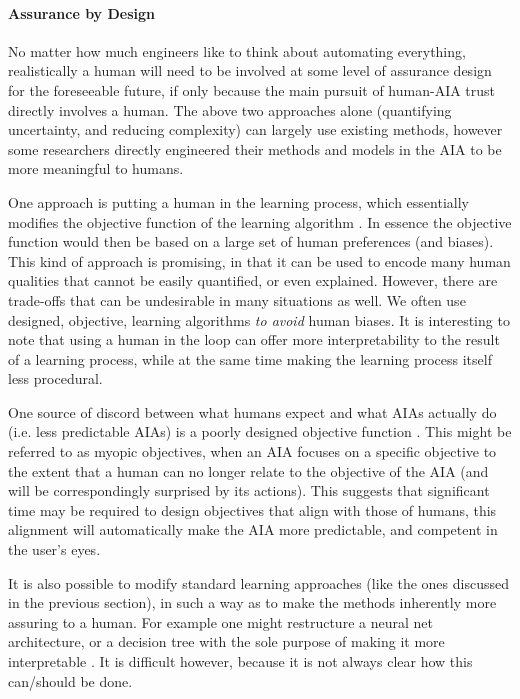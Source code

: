     \paragraph{Assurance by Design} No matter how much engineers like to think about automating everything, realistically a human will need to be involved at some level of assurance design for the foreseeable future, if only because the main pursuit of human-AIA trust directly involves a human. The above two approaches alone (quantifying uncertainty, and reducing complexity) can largely use existing methods, however some researchers directly engineered their methods and models in the AIA to be more meaningful to humans.

    One approach is putting a human in the learning process, which essentially modifies the objective function of the learning algorithm \cite{Freitas2006-qo}. In essence the objective function would then be based on a large set of human preferences (and biases). This kind of approach is promising, in that it can be used to encode many human qualities that cannot be easily quantified, or even explained. However, there are trade-offs that can be undesirable in many situations as well. We often use designed, objective, learning algorithms \emph{to avoid} human biases. It is interesting to note that using a human in the loop can offer more interpretability to the result of a learning process, while at the same time making the learning process itself less procedural.

    One source of discord between what humans expect and what AIAs actually do (i.e. less predictable AIAs) is a poorly designed objective function \cite{Amodei2016-xi}. This might be referred to as myopic objectives, when an AIA focuses on a specific objective to the extent that a human can no longer relate to the objective of the AIA (and will be correspondingly surprised by its actions). This suggests that significant time may be required to design objectives that align with those of humans, this alignment will automatically make the AIA more predictable, and competent in the user's eyes.

    It is also possible to modify standard learning approaches (like the ones discussed in the previous section), in such a way as to make the methods inherently more assuring to a human. For example one might restructure a neural net architecture, or a decision tree with the sole purpose of making it more interpretable \cite{Choi2016-by,Abdollahi2016-vn,Jovanovic2016-gw}. It is difficult however, because it is not always clear how this can/should be done.

